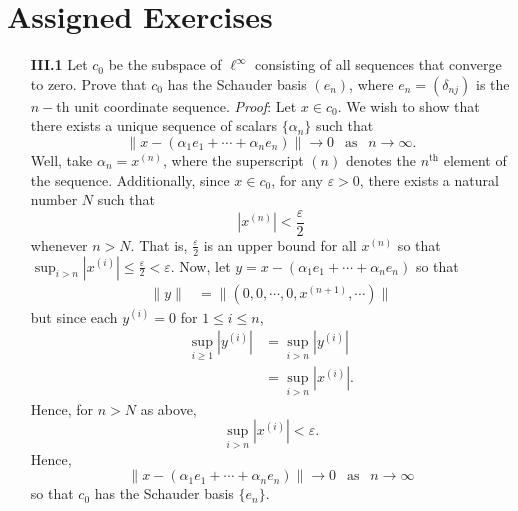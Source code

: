 \documentclass{article}
\begin{document}
\section*{Assigned Exercises}
\begin{itemize}
    \item[\textbf{III.1}] Let $c_0$ be the subspace of $\ell^{\infty}$ consisting of all sequences that converge to zero. Prove that $c_0$ has the Schauder basis $(e_n)$, where $e_n = (\delta_{nj})$ is the $n-$th unit coordinate sequence.
    \newline\newline
    \textit{Proof}: Let $x \in c_0$. We wish to show that there exists a unique sequence of scalars $\{\alpha_n\}$ such that 
    \[\|x - (\alpha_1e_1 + \cdots + \alpha_ne_n)\| \to 0 \:\: \text{ as } \:\: n \to \infty.\]
    Well, take $\alpha_n = x^{(n)}$, where the superscript $(n)$ denotes the $n^{\text{th}}$ element of the sequence. Additionally, since $x \in c_0$, for any $\varepsilon > 0$, there exists a natural number $N$ such that
    \[|x^{(n)}| < \frac{\varepsilon}{2}\]
    whenever $n > N$. That is, $\tfrac{\varepsilon}{2}$ is an upper bound for all $x^{(n)}$ so that $\sup_{i > n} |x^{(i)}| \leq \tfrac{\varepsilon}{2} < \varepsilon$. Now, let $y = x - (\alpha_1e_1 + \cdots + \alpha_ne_n)$ so that
    \begin{align*}
        \|y\| &= \|(0,0,\cdots, 0, x^{(n+1)}, \cdots)\|
    \end{align*}
    but since each $y^{(i)} = 0$ for $1 \leq i \leq n$, 
    \begin{align*}
        \sup_{i \geq 1}|y^{(i)}| &= \sup_{i > n} |y^{(i)}|\\
        &= \sup_{i > n} |x^{(i)}|.
    \end{align*}
    Hence, for $n > N$ as above,
    \[\sup_{i > n}|x^{(i)}| < \varepsilon.\]
    Hence, 
    \[\|x - (\alpha_1e_1 + \cdots + \alpha_ne_n)\| \to 0 \:\: \text{ as } \:\: n\to \infty\]
    so that $c_0$ has the Schauder basis $\{e_n\}$.
    
\end{itemize}
\end{document}
